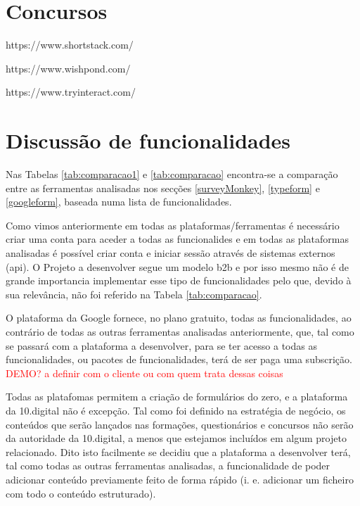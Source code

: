 \section{Concursos}
https://www.shortstack.com/

https://www.wishpond.com/

https://www.tryinteract.com/

\section{Discussão de funcionalidades}
\label{comparacao}
























Nas Tabelas \ref{tab:comparacao1} e \ref{tab:comparacao} encontra-se a comparação entre as ferramentas analisadas nos secções \ref{surveyMonkey}, \ref{typeform} e \ref{googleform}, baseada numa lista de funcionalidades.

Como vimos anteriormente em todas as plataformas/ferramentas é necessário criar uma conta para aceder a todas as funcionalides e em todas as plataformas analisadas é possível criar conta e iniciar sessão através de sistemas externos (\acrshort{api}). O Projeto a desenvolver segue um modelo \gls{b2b} e por isso mesmo não é de grande importancia implementar esse tipo de funcionalidades pelo que, devido à sua relevância, não foi referido na Tabela \ref{tab:comparacao}.

O plataforma da Google fornece, no plano gratuito, todas as funcionalidades, ao contrário de todas as outras ferramentas analisadas anteriormente, que, tal como se passará com a plataforma a desenvolver, para se ter acesso a todas as funcionalidades, ou pacotes de funcionalidades, terá de ser paga uma subscrição. \textcolor{red}{DEMO? a definir com o cliente ou com quem trata dessas coisas}

Todas as platafomas permitem a criação de formulários do zero, e a plataforma da 10.digital não é excepção. Tal como foi definido na estratégia de negócio, os conteúdos que serão lançados nas formações, questionários e concursos não serão da autoridade da 10.digital, a menos que estejamos incluídos em algum projeto relacionado. Dito isto facilmente se decidiu que a plataforma a desenvolver terá, tal como todas as outras ferramentas analisadas, a funcionalidade de poder adicionar conteúdo previamente feito de forma rápido (i. e. adicionar um ficheiro com todo o conteúdo estruturado). 


